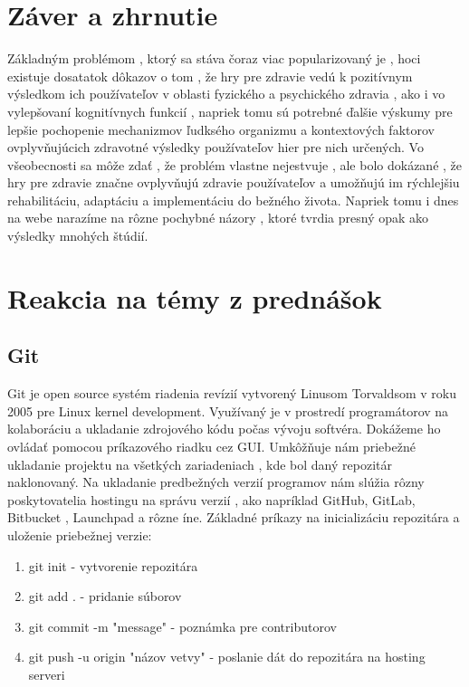 \documentclass[10pt,oneside,slovak,a4paper]{article}
\begin{document}
\section{Záver a zhrnutie} \label{dolezita}

Základným problémom , ktorý sa stáva čoraz viac popularizovaný je , hoci existuje dosatatok dôkazov o tom , že hry pre zdravie vedú k pozitívnym výsledkom ich používateľov v oblasti fyzického a psychického zdravia , ako i vo vylepšovaní kognitívnych funkcií , napriek tomu sú potrebné ďalšie výskumy pre lepšie pochopenie mechanizmov ľudksého organizmu a kontextových faktorov ovplyvňujúcich zdravotné výsledky používateľov hier pre nich určených. Vo všeobecnosti sa môže zdať , že problém vlastne nejestvuje , ale bolo dokázané , že hry pre zdravie značne ovplyvňujú zdravie používateľov a umožňujú im rýchlejšiu rehabilitáciu, adaptáciu a implementáciu do bežného života. Napriek tomu i dnes na webe narazíme na rôzne pochybné názory , ktoré tvrdia presný opak ako výsledky mnohých štúdií.
\section{Reakcia na témy z prednášok}
\subsection{Git}
Git je open source systém riadenia revízií vytvorený Linusom Torvaldsom v roku 2005 pre Linux kernel development. Využívaný je v prostredí programátorov na kolaboráciu a ukladanie zdrojového kódu počas vývoju softvéra. Dokážeme ho ovládať pomocou príkazového riadku cez GUI. Umkôžňuje nám priebežné ukladanie projektu na všetkých zariadeniach , kde bol daný repozitár naklonovaný. Na ukladanie predbežných verzií programov nám slúžia rôzny poskytovatelia hostingu na správu verzií , ako napríklad GitHub, GitLab, Bitbucket , Launchpad a rôzne íne. Základné príkazy na inicializáciu repozitára a uloženie priebežnej verzie: 
\begin{enumerate}
    \item{git init - vytvorenie repozitára}
    \item{git add . - pridanie súborov}
    \item{git commit -m "message" - poznámka pre contributorov}
    \item{git push -u origin "názov vetvy" - poslanie dát do repozitára na hosting serveri}
\end{enumerate}
\end{document}

